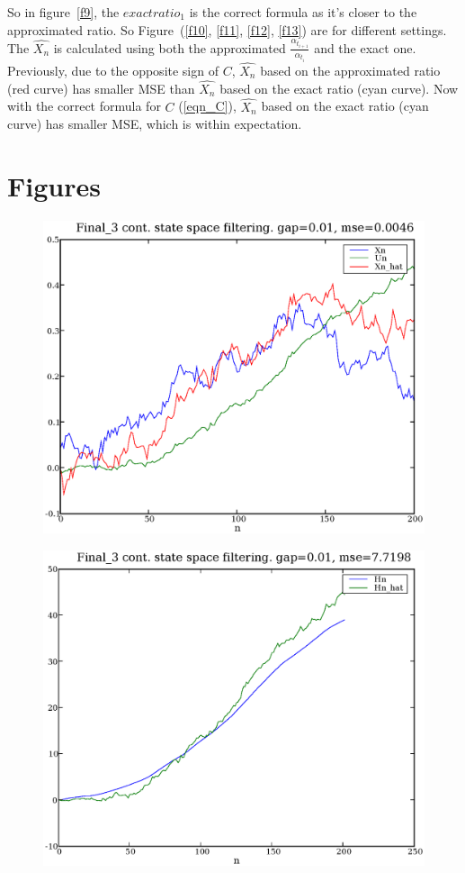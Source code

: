 \documentclass[a4paper,10pt]{article}
\begin{document}
So in figure~\ref{f9}, the ${exactratio}_1$ is the correct formula as it's closer to the approximated ratio. So Figure~(\ref{f10}, \ref{f11}, \ref{f12}, \ref{f13}) are for different settings. The $\hat{X_n}$ is calculated using both the approximated $\frac{\alpha_{t_{i+1}}}{\alpha_{t_i}}$ and the exact one. Previously, due to the opposite sign of $C$, $\hat{X_n}$ based on the approximated ratio (red curve) has smaller MSE than $\hat{X_n}$ based on the exact ratio (cyan curve). Now with the correct formula for $C$ (\ref{eqn_C}), $\hat{X_n}$ based on the exact ratio (cyan curve) has smaller MSE, which is within expectation.

\section{Figures}
\begin{figure}
\includegraphics[width=1\textwidth]{Final_3_Xn_Un_Xn_hat_gap_0.01.eps}
\caption{}\label{f1}
\end{figure}

\begin{figure}
\includegraphics[width=1\textwidth]{Final_3_Hn_Hn_hat_gap_0.01.eps}
\caption{}\label{f2}
\end{figure}
\end{document}
